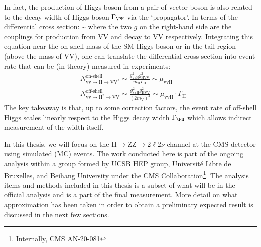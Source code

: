 In fact, the production of Higgs boson from a pair of vector boson is also related to the
decay width of Higgs boson $\Gamma_\text{\PH}$ via the `propagator'. In terms of the
differential cross section:
\be
\label{eqn:diff_xsec}
\sim 
{}
\ee
where the two $g$ on the right-hand side are the couplings for production from VV and decay
to VV respectively. Integrating this equation near the on-shell mass of the SM Higgs boson 
or in the tail region (above the mass of VV), one can translate the differential cross section
into event rate that can be (in theory) measured in experiments:
\begin{equation}
\begin{split}
&N_{\mathrm{vv} \rightarrow \mathrm{H} \rightarrow \mathrm{VV}^{*}}^{\text{on-shell}} \sim \frac{g_{\mathrm{vvH}}^{2} g_{\mathrm{HVV}}^{2}}{m_{\mathrm{H}} \Gamma_{\mathrm{H}}} \sim \mu_{\mathrm{vvH}}
\\
&N_{\mathrm{vv} \rightarrow \mathrm{H}^{*} \rightarrow \mathrm{VV}}^{\text{off-shell}} \sim \frac{g_{\mathrm{vvH}}^{2} g_{\mathrm{HVV}}^{2}}{\left(2 m_{\mathrm{V}}\right)^{2}} \sim \mu_{\mathrm{vvH}} \cdot \Gamma_{\mathrm{H}}
\end{split}
\end{equation}
The key takeaway is that, up to some correction factors, the event rate of off-shell Higgs scales
linearly respect to the Higgs decay width $\Gamma_\text{\PH}$ which allows indirect
measurement of the width itself.

In this thesis, we will focus on the $\mathrm{H} \rightarrow \mathrm{ZZ} \rightarrow 2\ell2\nu$ channel
at the CMS detector using simulated (MC) events. The work conducted here is part of the ongoing analysis
within a group formed by UCSB HEP group, Universit\'e Libre de Bruxelles, and Beihang University under
the CMS Collaboration\footnote{Internally, CMS AN-20-081}. The analysis items and methods included in this
thesis is a subset of what will be in the official analysis and is a part of the final measurement. More
detail on what approximation has been taken in order to obtain a preliminary expected result is discussed
in the next few sections.



